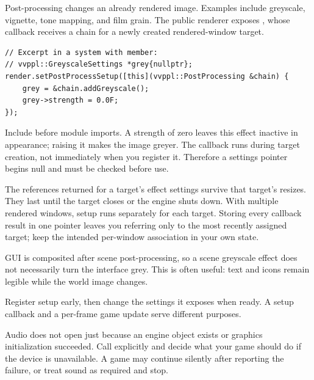 \documentclass[11pt,a4paper]{article}
\begin{document}
Post-processing changes an already rendered image. Examples include greyscale, vignette, tone mapping, and film grain. The public renderer exposes , whose callback receives a  chain for a newly created rendered-window target.
\begin{lstlisting}
// Excerpt in a system with member:
// vvppl::GreyscaleSettings *grey{nullptr};
render.setPostProcessSetup([this](vvppl::PostProcessing &chain) {
    grey = &chain.addGreyscale();
    grey->strength = 0.0F;
});
\end{lstlisting}
Include  before module imports. A strength of zero leaves this effect inactive in appearance; raising it makes the image greyer. The callback runs during target creation, not immediately when you register it. Therefore a settings pointer begins null and must be checked before use.

The references returned for a target's effect settings survive that target's resizes. They last until the target closes or the engine shuts down. With multiple rendered windows, setup runs separately for each target. Storing every callback result in one pointer leaves you referring only to the most recently assigned target; keep the intended per-window association in your own state.

GUI is composited after scene post-processing, so a scene greyscale effect does not necessarily turn the interface grey. This is often useful: text and icons remain legible while the world image changes.

\begin{remember}Register setup early, then change the settings it exposes when ready. A setup callback and a per-frame game update serve different purposes.\end{remember}

Audio does not open just because an engine object exists or graphics initialization succeeded. Call  explicitly and decide what your game should do if the device is unavailable. A game may continue silently after reporting the failure, or treat sound as required and stop.
\end{document}
